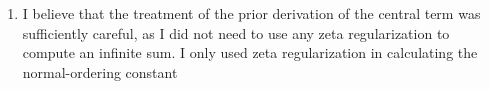 \documentclass[11pt, class=article, crop=false]{standalone}
\begin{document}
\begin{enumerate}
	 
	 \item 
	 I believe that the treatment of the prior derivation of the central term was sufficiently careful, as I did not need to use any zeta regularization to compute an infinite sum. I only used zeta regularization in calculating the normal-ordering constant
%

\end{enumerate}
\end{document}
